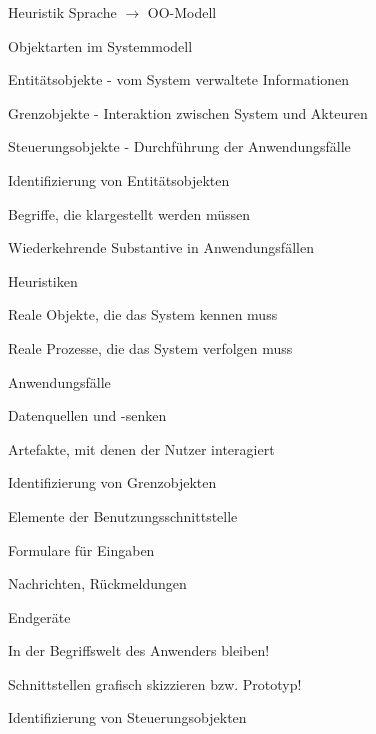 \documentclass[a4paper]{article}
\begin{document}
\begin{multicols}{3}
  \begin{itemize*}
    \item Heuristik Sprache $\rightarrow$ OO-Modell
    \item Objektarten im Systemmodell
          \begin{itemize*}
            \item Entitätsobjekte - vom System verwaltete Informationen
            \item Grenzobjekte - Interaktion zwischen System und Akteuren
            \item Steuerungsobjekte - Durchführung der Anwendungsfälle
          \end{itemize*}
    \item Identifizierung von Entitätsobjekten
          \begin{itemize*}
            \item Begriffe, die klargestellt werden müssen
            \item Wiederkehrende Substantive in Anwendungsfällen
                  \begin{itemize*}
                    \item Heuristiken
                  \end{itemize*}
            \item Reale Objekte, die das System kennen muss
            \item Reale Prozesse, die das System verfolgen muss
            \item Anwendungsfälle
            \item Datenquellen und -senken
            \item Artefakte, mit denen der Nutzer interagiert
          \end{itemize*}
    \item Identifizierung von Grenzobjekten
          \begin{itemize*}
            \item Elemente der Benutzungsschnittstelle
            \item Formulare für Eingaben
            \item Nachrichten, Rückmeldungen
            \item Endgeräte
            \item In der Begriffswelt des Anwenders bleiben!
            \item Schnittstellen grafisch skizzieren bzw. Prototyp!
          \end{itemize*}
    \item Identifizierung von Steuerungsobjekten

\end{itemize*}
\end{multicols}
\end{document}
